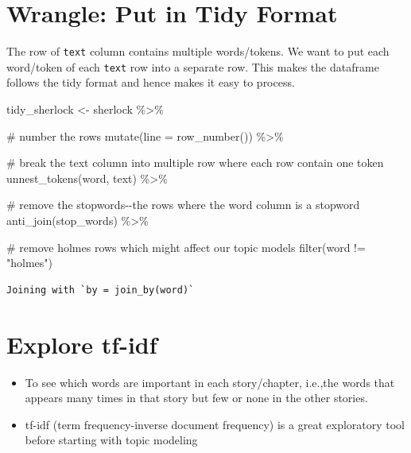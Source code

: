 \documentclass[
  letterpaper,
  DIV=11,
  numbers=noendperiod]{scrreprt}
\newenvironment{Shaded}{\begin{snugshade}}{\end{snugshade}}
\newcommand{\AttributeTok}[1]{\textcolor[rgb]{0.40,0.45,0.13}{#1}}
\newcommand{\CommentTok}[1]{\textcolor[rgb]{0.37,0.37,0.37}{#1}}
\newcommand{\FunctionTok}[1]{\textcolor[rgb]{0.28,0.35,0.67}{#1}}
\newcommand{\NormalTok}[1]{\textcolor[rgb]{0.00,0.23,0.31}{#1}}
\newcommand{\OtherTok}[1]{\textcolor[rgb]{0.00,0.23,0.31}{#1}}
\newcommand{\SpecialCharTok}[1]{\textcolor[rgb]{0.37,0.37,0.37}{#1}}
\newcommand{\StringTok}[1]{\textcolor[rgb]{0.13,0.47,0.30}{#1}}
\providecommand{\tightlist}{%
  \setlength{\itemsep}{0pt}\setlength{\parskip}{0pt}}\usepackage{longtable,booktabs,array}
\begin{document}
\section{Wrangle: Put in Tidy Format}\label{wrangle-put-in-tidy-format}

The row of \texttt{text} column contains multiple words/tokens. We want
to put each word/token of each \texttt{text} row into a separate row.
This makes the dataframe follows the tidy format and hence makes it easy
to process.

\begin{Shaded}
\begin{Highlighting}[]
\NormalTok{tidy\_sherlock }\OtherTok{\textless{}{-}}\NormalTok{ sherlock }\SpecialCharTok{\%\textgreater{}\%}
  
  \CommentTok{\# number the rows}
  \FunctionTok{mutate}\NormalTok{(}\AttributeTok{line =} \FunctionTok{row\_number}\NormalTok{()) }\SpecialCharTok{\%\textgreater{}\%} 
  
  \CommentTok{\# break the text column into multiple row where each row contain one token}
  \FunctionTok{unnest\_tokens}\NormalTok{(word, text) }\SpecialCharTok{\%\textgreater{}\%} 
  
  \CommentTok{\# remove the stopwords{-}{-}the rows where the word column is a stopword}
  \FunctionTok{anti\_join}\NormalTok{(stop\_words) }\SpecialCharTok{\%\textgreater{}\%} 
  
  \CommentTok{\# remove holmes rows which might affect our topic models}
  \FunctionTok{filter}\NormalTok{(word }\SpecialCharTok{!=} \StringTok{"holmes"}\NormalTok{)}
\end{Highlighting}
\end{Shaded}

\begin{verbatim}
Joining with `by = join_by(word)`
\end{verbatim}

\section{Explore tf-idf}\label{explore-tf-idf}

\begin{itemize}
\tightlist
\item
  To see which words are important in each story/chapter, i.e.,the words
  that appears many times in that story but few or none in the other
  stories.
\item
  tf-idf (term frequency-inverse document frequency) is a great
  exploratory tool before starting with topic modeling
\end{itemize}
\end{document}
